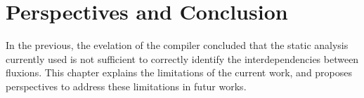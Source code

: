 \chapter{Perspectives and Conclusion} \label{chapter7}
\minitoc
\eject

In the previous, the evelation of the compiler concluded that the static analysis currently used is not sufficient to correctly identify the interdependencies between fluxions.
This chapter explains the limitations of the current work, and proposes perspectives to address these limitations in futur works.


